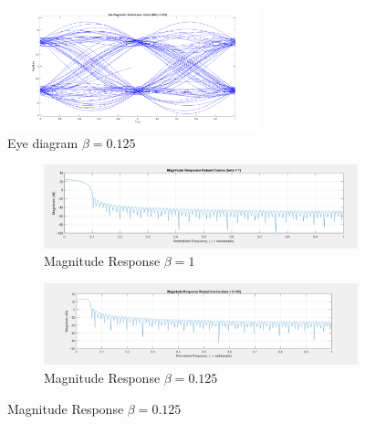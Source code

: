 \documentclass{article}
\begin{document}
\begin{figure}[h]
  \begin{center}
    \includegraphics[width=0.65\textwidth]{img/eye_diagram_beta_125.png}
    \caption{Eye diagram $\beta = 0.125$}
  \end{center}
\end{figure}

\begin{figure}[h]
  \begin{center}

    \begin{subfigure}[b]{0.5\linewidth}
      \includegraphics[width=\linewidth]{img/magnitude_response_beta_1.png}
      \caption{Magnitude Response $\beta = 1$}
    \end{subfigure}

    \begin{subfigure}[b]{0.5\linewidth}
      \includegraphics[width=\linewidth]{img/magnitude_response_beta_125.png}
      \caption{Magnitude Response $\beta = 0.125$}
    \end{subfigure}

  \end{center}
\end{figure}
\end{document}
